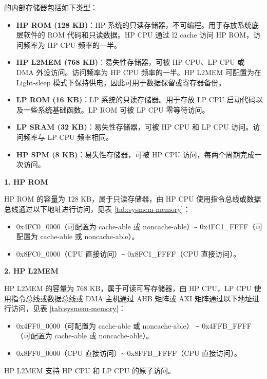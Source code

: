 \documentclass[main\_\_CN.tex]{subfiles}
\begin{document}
\chipname{} 的内部存储器包括如下类型：
\begin{itemize}
    \item \textbf{HP ROM (128 KB)}：HP 系统的只读存储器，不可编程。用于存放系统底层软件的 ROM 代码和只读数据。HP CPU 通过 l2 cache 访问 HP ROM，访问频率为 HP CPU 频率的一半。
    \item \textbf{HP L2MEM (768 KB)}：易失性存储器，可被 HP CPU、LP CPU 或 DMA 外设访问。访问频率为 HP CPU 频率的一半。HP L2MEM 可配置为在 Light-sleep 模式下保持供电，因此可用于数据保留或寄存器备份。
    \item \textbf{LP ROM (16 KB)}：LP 系统的只读存储器。用于存放 LP CPU 启动代码以及一些系统基础函数。LP ROM 可被 LP CPU 零等待访问。
    \item \textbf{LP SRAM (32 KB)}：易失性存储器，可被 HP CPU 和 LP CPU 访问。访问频率与 LP CPU 频率相同。
    \item \textbf{HP SPM (8 KB)}：易失性存储器，可被 HP CPU 访问，每两个周期完成一次访问。
\end{itemize}

{\bfseries 1. HP ROM}

HP ROM 的容量为 128 KB，属于只读存储器，由 HP CPU 使用指令总线或数据总线通过以下地址进行访问，见表 \ref{tab:sysmem-memory}：
\begin{itemize}
    \item  0x4FC0\_0000（可配置为 cache-able 或 noncache-able）\verb+~+ 0x4FC1\_FFFF（可配置为 cache-able 或 noncache-able）。
    \item 0x8FC0\_0000（CPU 直接访问）\verb+~+ 0x8FC1\_FFFF（CPU 直接访问）。
\end{itemize}

{\bfseries  2. HP L2MEM}
\label{other:sysmem-internal-sram-0}

HP L2MEM 的容量为 768 KB，属于可读可写存储器，由 HP CPU，LP CPU 使用指令总线或数据总线或 DMA 主机通过 AHB 矩阵或 AXI 矩阵通过以下地址进行访问，见表 \ref{tab:sysmem-memory}：
\begin{itemize}
    \item 0x4FF0\_0000（可配置为 cache-able 或 noncache-able） \verb+~+ 0x4FFB\_FFFF（可配置为 cache-able 或 noncache-able）。
    \item 0x8FF0\_0000（CPU 直接访问）\verb+~+ 0x8FFB\_FFFF（CPU 直接访问）。
\end{itemize}

HP L2MEM 支持 HP CPU 和 LP CPU 的原子访问。
\end{document}
